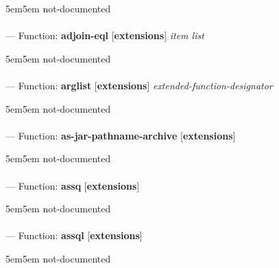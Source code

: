 \begin{adjustwidth}{5em}{5em}
not-documented
\end{adjustwidth}

\paragraph{}
\label{EXTENSIONS:ADJOIN-EQL}
--- Function: \textbf{adjoin-eql} [\textbf{extensions}] \textit{item list}

\begin{adjustwidth}{5em}{5em}
not-documented
\end{adjustwidth}

\paragraph{}
\label{EXTENSIONS:ARGLIST}
--- Function: \textbf{arglist} [\textbf{extensions}] \textit{extended-function-designator}

\begin{adjustwidth}{5em}{5em}
not-documented
\end{adjustwidth}

\paragraph{}
\label{EXTENSIONS:AS-JAR-PATHNAME-ARCHIVE}
--- Function: \textbf{as-jar-pathname-archive} [\textbf{extensions}] \textit{}

\begin{adjustwidth}{5em}{5em}
not-documented
\end{adjustwidth}

\paragraph{}
\label{EXTENSIONS:ASSQ}
--- Function: \textbf{assq} [\textbf{extensions}] \textit{}

\begin{adjustwidth}{5em}{5em}
not-documented
\end{adjustwidth}

\paragraph{}
\label{EXTENSIONS:ASSQL}
--- Function: \textbf{assql} [\textbf{extensions}] \textit{}

\begin{adjustwidth}{5em}{5em}
not-documented
\end{adjustwidth}

